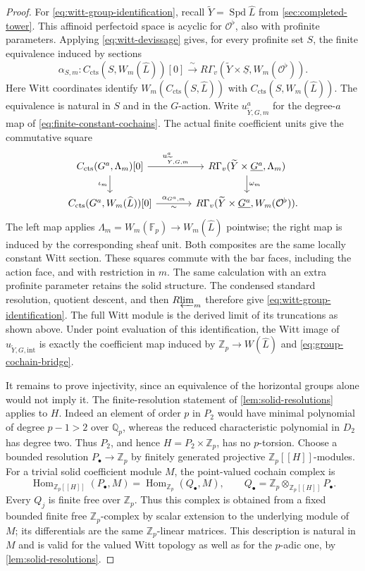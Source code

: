 \documentclass[11pt]{article}
\numberwithin{equation}{section}
\theoremstyle{definition}
\theoremstyle{remark}
\newcommand{\Q}{\mathbb Q}
\newcommand{\Z}{\mathbb Z}
\newcommand{\F}{\mathbb F}
\newcommand{\cO}{\mathcal O}
\newcommand{\cts}{\mathrm{cts}}
\DeclareMathOperator{\Hom}{Hom}
\DeclareMathOperator{\Spd}{Spd}
\newcommand{\Rlim}{R\!\varprojlim}
\begin{document}
\begin{proof}
For \eqref{eq:witt-group-identification}, recall
$\widetilde Y=\Spd\widehat L$ from \cref{sec:completed-tower}.
This affinoid perfectoid space is acyclic for $\cO^\flat$, also with
profinite parameters.  Applying \eqref{eq:witt-devissage} gives, for
every profinite set $S$, the finite equivalence induced by sections
\[
 \alpha_{S,m}:C_{\cts}(S,W_m(\widehat L))[0]
       \xrightarrow{\ \sim\ }
 R\Gamma_v(\widetilde Y\times\underline S,W_m(\cO^\flat)).
\]
Here Witt coordinates identify $W_m(C_{\cts}(S,\widehat L))$ with
$C_{\cts}(S,W_m(\widehat L))$.  The equivalence is natural in $S$
and in the $G$-action.  Write $u^a_{\widetilde Y,G,m}$ for the
degree-$a$ map of \eqref{eq:finite-constant-cochains}.  The actual
finite coefficient units give the commutative square
\begin{equation}\label{eq:finite-witt-constant-square}
\begin{tikzcd}[column sep=large]
 C_{\cts}(G^a,\Lambda_m)[0]
    \arrow[r,"u^a_{\widetilde Y,G,m}"] \arrow[d,"\iota_m"']
   &R\Gamma_v(\widetilde Y\times\underline{G^a},\Lambda_m)
       \arrow[d,"\omega_m"]\\
 C_{\cts}(G^a,W_m(\widehat L))[0]
    \arrow[r,"\alpha_{G^a,m}","\sim"']
   &R\Gamma_v(\widetilde Y\times\underline{G^a},W_m(\cO^\flat)).
\end{tikzcd}
\end{equation}
The left map applies $\Lambda_m=W_m(\F_p)\to W_m(\widehat L)$
pointwise; the right map is induced by the corresponding sheaf unit.
Both composites are the same locally constant Witt section.  These
squares commute with the bar faces, including the action face, and
with restriction in $m$.  The same calculation with an extra
profinite parameter retains the solid structure.  The condensed
standard resolution, quotient descent, and then $\Rlim_m$ therefore
give \eqref{eq:witt-group-identification}.  The full Witt module is
the derived limit of its truncations as shown above.  Under point
evaluation of this identification, the Witt image of
$u_{\widetilde Y,G,\mathrm{int}}$ is exactly the coefficient map
induced by $\Z_p\to W(\widehat L)$ and
\eqref{eq:group-cochain-bridge}.

It remains to prove injectivity, since an equivalence of the horizontal
groups alone would not imply it.  The finite-resolution statement of
\cref{lem:solid-resolutions} applies to $H$.  Indeed an element of
order $p$ in $P_2$ would have minimal polynomial of degree $p-1>2$
over $\Q_p$, whereas the reduced characteristic polynomial in $D_2$
has degree two.  Thus $P_2$, and hence $H=P_2\times\Z_p$, has no
$p$-torsion.
Choose a bounded resolution $P_\bullet\to\Z_p$ by finitely generated
projective $\Z_p[[H]]$-modules.  For a trivial solid coefficient module
$M$, the point-valued cochain complex is
\[
 \Hom_{\Z_p[[H]]}(P_\bullet,M)
   =\Hom_{\Z_p}(Q_\bullet,M),
 \qquad
 Q_\bullet=\Z_p\otimes_{\Z_p[[H]]}P_\bullet.
\]
Every $Q_j$ is finite free over $\Z_p$.  Thus this complex is obtained
from a fixed bounded finite free $\Z_p$-complex by scalar extension
to the underlying module of $M$; its differentials are the same
$\Z_p$-linear matrices.  This description is natural in $M$ and is
valid for the valued Witt topology as well as for the $p$-adic one,
by \cref{lem:solid-resolutions}.


\end{proof}
\end{document}
